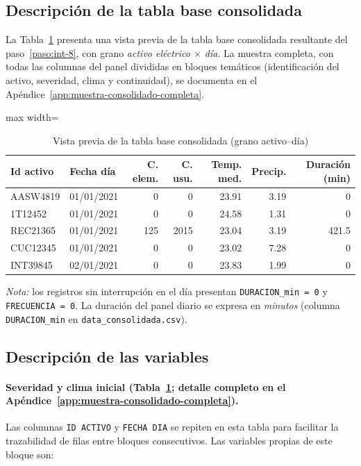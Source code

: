 \subsection{Descripción de la tabla base consolidada}
    La Tabla~\ref{tab:muestra_consolidado_preview} presenta una vista previa de la tabla base consolidada resultante del paso~\ref{paso:int-8}, con grano \textit{activo eléctrico $\times$ día}. La muestra completa, con todas las columnas del panel divididas en bloques temáticos (identificación del activo, severidad, clima y continuidad), se documenta en el Apéndice~\ref{app:muestra-consolidado-completa}.

\begin{table}[!htbp]
\centering
    \small
    \caption{Vista previa de la tabla base consolidada (grano activo--día)}
    \label{tab:muestra_consolidado_preview}
    \begin{adjustbox}{max width=\linewidth}
\begin{tabular}{l l r r r r r}
    \toprule
    \textbf{Id activo} & \textbf{Fecha día} & \textbf{C. elem.} & \textbf{C. usu.} & \textbf{Temp. med.} & \textbf{Precip.} & \textbf{Duración (min)} \\
    \midrule
    AASW4819 & 01/01/2021 & 0   & 0    & 23.91 & 3.19 & 0     \\
    1T12452  & 01/01/2021 & 0   & 0    & 24.58 & 1.31 & 0     \\
    REC21365 & 01/01/2021 & 125 & 2015 & 23.04 & 3.19 & 421.5 \\
    CUC12345 & 01/01/2021 & 0   & 0    & 23.02 & 7.28 & 0     \\
    INT39845 & 02/01/2021 & 0   & 0    & 23.83 & 1.99 & 0     \\
    \bottomrule
    \end{tabular}
\end{adjustbox}
    \end{table}

    \noindent\textit{Nota:} los registros sin interrupción en el día presentan \texttt{DURACION\_min = 0} y \texttt{FRECUENCIA = 0}. La duración del panel diario se expresa en \textit{minutos} (columna \texttt{DURACION\_min} en \texttt{data\_consolidada.csv}).
    
\subsection{Descripción de las variables}
    \paragraph{Severidad y clima inicial (Tabla~\ref{tab:muestra_consolidado_preview}; detalle completo en el Apéndice~\ref{app:muestra-consolidado-completa}).}
    Las columnas \texttt{ID ACTIVO} y \texttt{FECHA DIA} se repiten en esta tabla para facilitar la trazabilidad de filas entre bloques consecutivos. Las variables propias de este bloque son:
    
